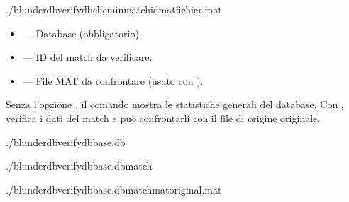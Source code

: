 \documentclass[letterpaper,10pt,italian]{sphinxmanual}
\begin{document}
\begin{sphinxVerbatim}[commandchars=\\\{\}]
./blunderdbverify\PYGZhy{}\PYGZhy{}db\PYGZlt{}chemin\PYGZgt{}\PYG{o}{[}\PYGZhy{}\PYGZhy{}match\PYGZlt{}id\PYGZgt{}\PYG{o}{]}\PYG{o}{[}\PYGZhy{}\PYGZhy{}mat\PYGZlt{}fichier.mat\PYGZgt{}\PYG{o}{]}
\end{sphinxVerbatim}

\sphinxAtStartPar
{}
\begin{itemize}
\item {} 
\sphinxAtStartPar
{} — Database (obbligatorio).

\item {} 
\sphinxAtStartPar
{} — ID del match da verificare.

\item {} 
\sphinxAtStartPar
{} — File MAT da confrontare (usato con ).

\end{itemize}

\sphinxAtStartPar
Senza l’opzione , il comando mostra le statistiche generali del database. Con , verifica i dati del match e può confrontarli con il file di origine originale.

\sphinxAtStartPar
{}

\begin{sphinxVerbatim}[commandchars=\\\{\}]
./blunderdbverify\PYGZhy{}\PYGZhy{}dbbase.db

./blunderdbverify\PYGZhy{}\PYGZhy{}dbbase.db\PYGZhy{}\PYGZhy{}match

./blunderdbverify\PYGZhy{}\PYGZhy{}dbbase.db\PYGZhy{}\PYGZhy{}match\PYGZhy{}\PYGZhy{}matoriginal.mat
\end{sphinxVerbatim}
\end{document}

